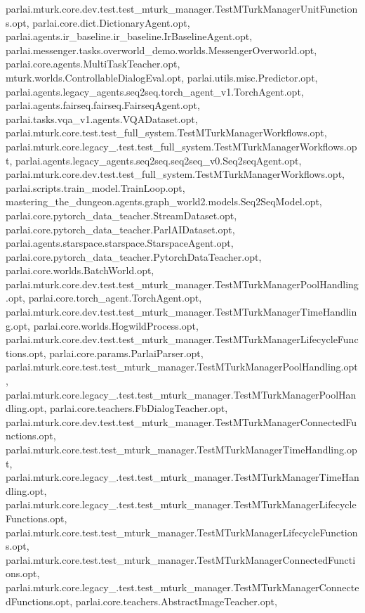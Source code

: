 parlai.\+mturk.\+core.\+dev.\+test.\+test\+\_\+mturk\+\_\+manager.\+Test\+M\+Turk\+Manager\+Unit\+Functions.\+opt, parlai.\+core.\+dict.\+Dictionary\+Agent.\+opt, parlai.\+agents.\+ir\+\_\+baseline.\+ir\+\_\+baseline.\+Ir\+Baseline\+Agent.\+opt, parlai.\+messenger.\+tasks.\+overworld\+\_\+demo.\+worlds.\+Messenger\+Overworld.\+opt, parlai.\+core.\+agents.\+Multi\+Task\+Teacher.\+opt, mturk.\+worlds.\+Controllable\+Dialog\+Eval.\+opt, parlai.\+utils.\+misc.\+Predictor.\+opt, parlai.\+agents.\+legacy\+\_\+agents.\+seq2seq.\+torch\+\_\+agent\+\_\+v1.\+Torch\+Agent.\+opt, parlai.\+agents.\+fairseq.\+fairseq.\+Fairseq\+Agent.\+opt, parlai.\+tasks.\+vqa\+\_\+v1.\+agents.\+V\+Q\+A\+Dataset.\+opt, parlai.\+mturk.\+core.\+test.\+test\+\_\+full\+\_\+system.\+Test\+M\+Turk\+Manager\+Workflows.\+opt, parlai.\+mturk.\+core.\+legacy\+\_.\+test.\+test\+\_\+full\+\_\+system.\+Test\+M\+Turk\+Manager\+Workflows.\+opt, parlai.\+agents.\+legacy\+\_\+agents.\+seq2seq.\+seq2seq\+\_\+v0.\+Seq2seq\+Agent.\+opt, parlai.\+mturk.\+core.\+dev.\+test.\+test\+\_\+full\+\_\+system.\+Test\+M\+Turk\+Manager\+Workflows.\+opt, parlai.\+scripts.\+train\+\_\+model.\+Train\+Loop.\+opt, mastering\+\_\+the\+\_\+dungeon.\+agents.\+graph\+\_\+world2.\+models.\+Seq2\+Seq\+Model.\+opt, parlai.\+core.\+pytorch\+\_\+data\+\_\+teacher.\+Stream\+Dataset.\+opt, parlai.\+core.\+pytorch\+\_\+data\+\_\+teacher.\+Parl\+A\+I\+Dataset.\+opt, parlai.\+agents.\+starspace.\+starspace.\+Starspace\+Agent.\+opt, parlai.\+core.\+pytorch\+\_\+data\+\_\+teacher.\+Pytorch\+Data\+Teacher.\+opt, parlai.\+core.\+worlds.\+Batch\+World.\+opt, parlai.\+mturk.\+core.\+dev.\+test.\+test\+\_\+mturk\+\_\+manager.\+Test\+M\+Turk\+Manager\+Pool\+Handling.\+opt, parlai.\+core.\+torch\+\_\+agent.\+Torch\+Agent.\+opt, parlai.\+mturk.\+core.\+dev.\+test.\+test\+\_\+mturk\+\_\+manager.\+Test\+M\+Turk\+Manager\+Time\+Handling.\+opt, parlai.\+core.\+worlds.\+Hogwild\+Process.\+opt, parlai.\+mturk.\+core.\+dev.\+test.\+test\+\_\+mturk\+\_\+manager.\+Test\+M\+Turk\+Manager\+Lifecycle\+Functions.\+opt, parlai.\+core.\+params.\+Parlai\+Parser.\+opt, parlai.\+mturk.\+core.\+test.\+test\+\_\+mturk\+\_\+manager.\+Test\+M\+Turk\+Manager\+Pool\+Handling.\+opt, parlai.\+mturk.\+core.\+legacy\+\_.\+test.\+test\+\_\+mturk\+\_\+manager.\+Test\+M\+Turk\+Manager\+Pool\+Handling.\+opt, parlai.\+core.\+teachers.\+Fb\+Dialog\+Teacher.\+opt, parlai.\+mturk.\+core.\+dev.\+test.\+test\+\_\+mturk\+\_\+manager.\+Test\+M\+Turk\+Manager\+Connected\+Functions.\+opt, parlai.\+mturk.\+core.\+test.\+test\+\_\+mturk\+\_\+manager.\+Test\+M\+Turk\+Manager\+Time\+Handling.\+opt, parlai.\+mturk.\+core.\+legacy\+\_.\+test.\+test\+\_\+mturk\+\_\+manager.\+Test\+M\+Turk\+Manager\+Time\+Handling.\+opt, parlai.\+mturk.\+core.\+legacy\+\_.\+test.\+test\+\_\+mturk\+\_\+manager.\+Test\+M\+Turk\+Manager\+Lifecycle\+Functions.\+opt, parlai.\+mturk.\+core.\+test.\+test\+\_\+mturk\+\_\+manager.\+Test\+M\+Turk\+Manager\+Lifecycle\+Functions.\+opt, parlai.\+mturk.\+core.\+test.\+test\+\_\+mturk\+\_\+manager.\+Test\+M\+Turk\+Manager\+Connected\+Functions.\+opt, parlai.\+mturk.\+core.\+legacy\+\_.\+test.\+test\+\_\+mturk\+\_\+manager.\+Test\+M\+Turk\+Manager\+Connected\+Functions.\+opt, parlai.\+core.\+teachers.\+Abstract\+Image\+Teacher.\+opt, 